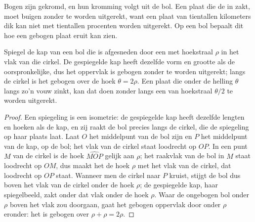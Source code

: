 Bogen zijn gekromd, en hun kromming volgt uit de bol. Een plaat die de  in zakt, moet buigen zonder te worden uitgerekt, want een plaat van tientallen kilometers dik kan niet met tientallen procenten worden uitgerekt. Op een bol bepaalt dit hoe een gebogen plaat eruit kan zien.

\begin{proposition}\label{prop:b1:active-margins:shell}
Spiegel de kap van een bol die is afgesneden door een  met hoekstraal
$\rho$ in het vlak van die cirkel. De gespiegelde kap heeft dezelfde vorm en grootte als de oorspronkelijke, dus het oppervlak is gebogen zonder te worden uitgerekt;
langs de cirkel is het gebogen over de hoek $\theta = 2\rho$. Een plaat die onder de helling $\theta$ langs zo'n vouw zinkt, kan dat doen zonder langs een  van hoekstraal $\theta/2$ te worden uitgerekt.
\end{proposition}

\begin{proof}
Een spiegeling is een isometrie: de gespiegelde kap heeft dezelfde lengten en hoeken als de kap, en zij raakt de bol precies langs de cirkel, die de spiegeling op haar plaats laat. Laat $O$ het middelpunt van de bol zijn en $P$ het middelpunt van de kap, op de bol; het vlak van de cirkel staat loodrecht op
$OP$. In een punt $M$ van de cirkel is de hoek $\widehat{MOP}$ gelijk aan $\rho$; het raakvlak van de bol in $M$ staat loodrecht op $OM$, dus maakt het de hoek $\rho$ met het vlak van de cirkel, dat loodrecht op $OP$ staat. Wanneer men de cirkel naar $P$ kruist, stijgt de bol dus boven het vlak van de cirkel onder de hoek $\rho$; de gespiegelde kap, haar spiegelbeeld, zakt onder dat vlak onder de hoek $\rho$. Waar de ongebogen bol onder $\rho$ boven het vlak zou doorgaan, gaat het gebogen oppervlak door onder $\rho$ eronder: het is gebogen over $\rho + \rho = 2\rho$.
\end{proof}

